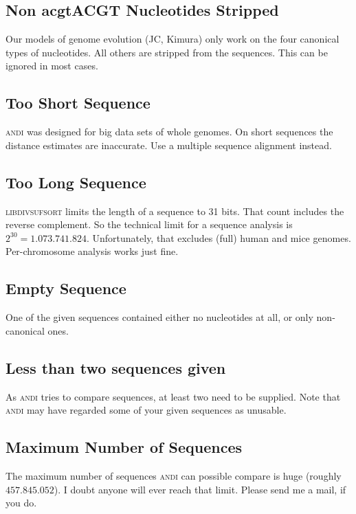 \documentclass[a4paper,
  10pt,
  english,
  DIV=12,
  BCOR=8mm]{scrbook}
\newcommand{\algo}[1]{\textsc{{#1}}}
\newcommand{\andi}{\algo{andi}\xspace}
\begin{document}
\subsection*{Non acgtACGT Nucleotides Stripped}

Our models of genome evolution (JC, Kimura) only work on the four canonical types of nucleotides. All others are stripped from the sequences. This can be ignored in most cases.

\subsection*{Too Short Sequence}

\andi was designed for big data sets of whole genomes. On short sequences the distance estimates are inaccurate. Use a multiple sequence alignment instead.

\subsection*{Too Long Sequence}

\algo{libdivsufsort} limits the length of a sequence to 31 bits. That count includes the reverse complement. So the technical limit for a sequence analysis is $2^{30} = 1.073.741.824$. Unfortunately, that excludes (full) human and mice genomes. Per-chromosome analysis works just fine.

\subsection*{Empty Sequence}

One of the given sequences contained either no nucleotides at all, or only non-canonical ones.

\subsection*{Less than two sequences given}

As \andi tries to compare sequences, at least two need to be supplied. Note that \andi may have regarded some of your given sequences as unusable.

\subsection*{Maximum Number of Sequences}

The maximum number of sequences \andi can possible compare is huge (roughly $457.845.052$). I doubt anyone will ever reach that limit. Please send me a mail, if you do.
\end{document}
